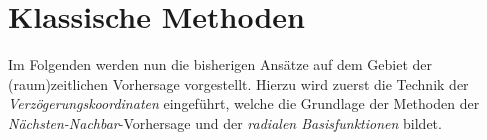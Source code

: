 \section{Klassische Methoden}
Im Folgenden werden nun die bisherigen Ansätze auf dem Gebiet der (raum)zeitlichen Vorhersage vorgestellt. Hierzu wird zuerst die Technik der \textit{Verzögerungskoordinaten} eingeführt, welche die Grundlage der Methoden der \textit{Nächsten-Nachbar}-Vorhersage und der \textit{radialen Basisfunktionen} bildet.
 


